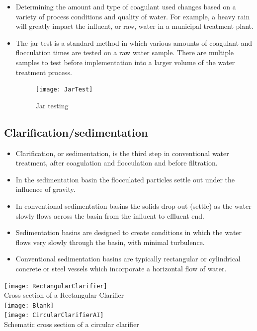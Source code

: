 \begin{itemize}
\item Determining the amount and type of coagulant used changes based on a variety of process conditions and quality of water. For example, a heavy rain will greatly impact the influent, or raw, water in a municipal treatment plant.

\item The jar test is a standard method in which various amounts of coagulant and flocculation times are tested on a raw water sample. There are multiple samples to test before implementation into a larger volume of the water treatment process.

\begin{figure}[h]
\begin{center}
\texttt{[image: JarTest]}
\caption{Jar testing}
\label{table:Jartesting}
\end{center}
\end{figure}	

\end{itemize}
\subsection{Clarification/sedimentation}
\begin{itemize}
\item Clarification, or sedimentation, is the third step in conventional water treatment, after coagulation and flocculation and before filtration.
\item In the sedimentation basin the flocculated particles settle out under the influence of gravity.
\item In conventional sedimentation basins the solids drop out (settle) as the water slowly flows across the basin from the influent to effluent end.
\item Sedimentation basins are designed to create conditions in which the water flows very slowly through the basin, with minimal turbulence.
\item Conventional sedimentation basins are typically rectangular or cylindrical concrete or steel vessels which incorporate a horizontal flow of water.
\end{itemize}

			\begin{center}
				\texttt{[image: RectangularClarifier]}\\
				Cross section of a Rectangular Clarifier\\

				\texttt{[image: Blank]}\\
				\texttt{[image: CircularClarifierAI]}\\
				Schematic cross section of a circular clarifier\\
			\end{center}


